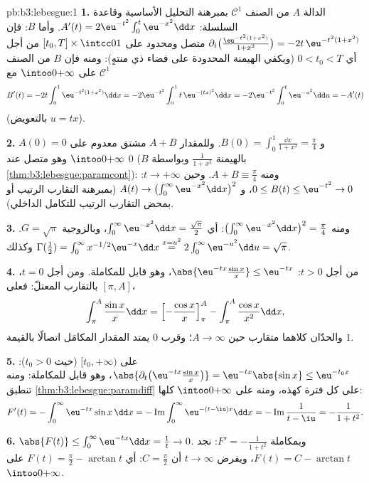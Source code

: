\begin{solution}{pb:b3:lebesgue:1}
\textbf{1.} الدالة $A$ من الصنف $\mathcal C^1$ بمبرهنة التحليل
الأساسية وقاعدة السلسلة: $A'(t) =
2\eu^{-t^2}\int_0^t\eu^{-x^2}\dd x$. وأما $B$: فإن $\partial_t\bigl(\frac{\eu^{-t^2(1+x^2)}}{1+x^2}\bigr) =
-2t\,\eu^{-t^2(1+x^2)}$ متصل
ومحدود على $[t_0, T]
\times \intcc01$ من أجل أي $0 < t_0 < T$ (ويكفي الهيمنة
المحدودة على فضاء ذي  منتهٍ): ومنه فإن $B$ من الصنف
$\mathcal C^1$ على $\intoo0{+\infty}$ مع
\[
B'(t) = -2t\int_0^1 \eu^{-t^2(1+x^2)}\dd x
= -2\eu^{-t^2}\int_0^1 t\,\eu^{-(tx)^2}\dd x
= -2\eu^{-t^2}\int_0^t\eu^{-u^2}\dd u = -A'(t)
\]
(بالتعويض $u = tx$).

\textbf{2.} $A(0) = 0$ و $B(0) = \int_0^1\frac{\dd x}{1+x^2}
= \frac\pi4$. وللمقدار $A + B$ مشتق معدوم
على $\intoo0{+\infty}$ وهو متصل عند $0$ ($B$ بالهيمنة $\frac1{1+x^2}$
وبواسطة \cref{thm:b3:lebesgue:paramcont}): ومنه $A + B \equiv \frac\pi4$. وحين $t\to+\infty$: $0 \leq B(t) \leq \eu^{-t^2} \to 0$،
و $A(t) \to \bigl(\int_0^\infty\eu^{-x^2}\dd x\bigr)^2$ (بمبرهنة التقارب الرتيب أو بمحض التقارب الرتيب
للتكامل الداخلي).

\textbf{3.} ومنه $\bigl(\int_0^\infty\eu^{-x^2}\dd x\bigr)^2
= \frac\pi4$: أي $\int_0^\infty\eu^{-x^2}\dd x =
\frac{\sqrt\pi}2$، وبالزوجية $G = \sqrt\pi$.
وكذلك $\Gamma(\frac12) = \int_0^\infty x^{-1/2}\eu^{-x}\dd x
\overset{x = u^2}{=} 2\int_0^\infty\eu^{-u^2}\dd u =
\sqrt\pi$.

\textbf{4.} من أجل $t > 0$: $\abs{\eu^{-tx}\frac{\sin x}x} \leq
\eu^{-tx}$، وهو قابل للمكاملة. ومن أجل
$t = 0$، بالتقارب المعتلّ: فعلى $[\pi, A]$،
\[
\int_\pi^A\frac{\sin x}x\dd x
= \Bigl[-\frac{\cos x}x\Bigr]_\pi^A -
\int_\pi^A\frac{\cos x}{x^2}\dd x,
\]
والحدّان كلاهما متقارب حين $A \to \infty$؛ وقرب $0$ يمتد
المقدار المكامَل اتصالًا بالقيمة $1$.

\textbf{5.} على $[t_0, +\infty)$ (حيث $t_0 > 0$): $\abs{\partial_t\bigl(\eu^{-tx}\tfrac{\sin x}x\bigr)} =
\eu^{-tx}\abs{\sin x} \leq \eu^{-t_0x}$، وهو
قابل للمكاملة: ومنه تنطبق \cref{thm:b3:lebesgue:paramdiff} على كل فترة كهذه، ومنه
على $\intoo0{+\infty}$ كلها:
\[
F'(t) = -\int_0^\infty\eu^{-tx}\sin x\,\dd x
= -\operatorname{Im}\int_0^\infty\eu^{-(t - \iu)x}\dd x
= -\operatorname{Im}\frac{1}{t - \iu} = -\frac{1}{1 + t^2}.
\]

\textbf{6.} $\abs{F(t)} \leq \int_0^\infty\eu^{-tx}\dd x =
\frac1t \to 0$. وبمكاملة $F' = -\frac1{1+t^2}$: نجد $F(t) = C -
\arctan t$، ويفرض
$t \to \infty$ أن $C = \frac\pi2$: أي $F(t) =
\frac\pi2 - \arctan t$ على $\intoo0{+\infty}$.


\end{solution}
